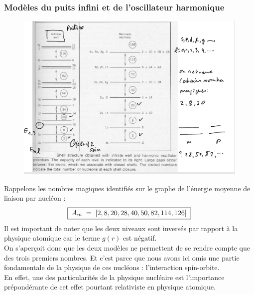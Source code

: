 \subsubsection{Modèles du puits infini et de l'oscillateur harmonique}
\begin{figure}[H]
    \centering
    \includegraphics[scale = 0.6]{Images4/infinite_well_and_harmonic_oscillator.PNG}
\end{figure}
Rappelons les nombres magiques identifiés sur le graphe de l'énergie moyenne de liaison par nucléon :
\[
    \boxed{
    \;A_m \; = \; [2,8,20,28,40,50,82,114,126]\;
    }
\]
Il est important de noter que les deux niveaux sont inversés par rapport à la physique atomique car le terme $g(r)$ est négatif.\\
On s'aperçoit donc que les deux modèles ne permettent de se rendre compte que des trois premiers nombres. Et c'est parce que nous avons ici omis une partie fondamentale de la physique de ces nucléons : l'interaction spin-orbite.\\
En effet, une des particularités de la physique nucléaire est l'importance prépondérante de cet effet pourtant relativiste en physique atomique.
